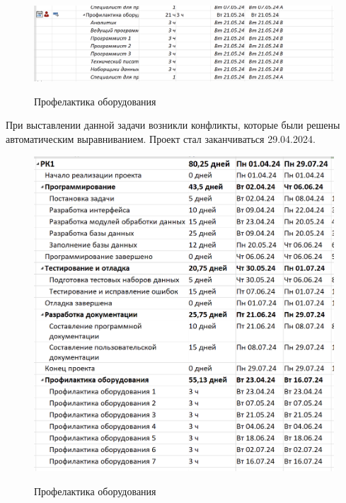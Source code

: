 \begin{figure}[ht!]
	\includegraphics[width=0.75\linewidth]{assets/images/8.3-conflicts.png}
	\label{fig:r2}
	\caption{Профелактика оборудования}
\end{figure}
\FloatBarrier

При выставлении данной задачи возникли конфликты, которые были решены автоматическим выравниванием.
Проект стал заканчиваться 29.04.2024.

\begin{figure}[ht!]
	\includegraphics[width=0.75\linewidth]{assets/images/8.4-conf.png}
	\label{fig:r2}
	\caption{Профелактика оборудования}
\end{figure}
\FloatBarrier
